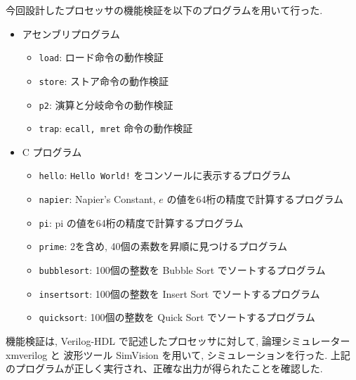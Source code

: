 \documentclass[../main.tex]{subfiles}
\begin{document}
  今回設計したプロセッサの機能検証を以下のプログラムを用いて行った.

  \begin{itemize}
    \item アセンブリプログラム
    \begin{itemize}
      \item \verb|load|: ロード命令の動作検証
      \item \verb|store|: ストア命令の動作検証
      \item \verb|p2|: 演算と分岐命令の動作検証
      \item \verb|trap|: \verb|ecall, mret| 命令の動作検証
    \end{itemize}

    \item C プログラム
    \begin{itemize}
      \item \verb|hello|: \verb|Hello World!| をコンソールに表示するプログラム
      \item \verb|napier|: Napier's Constant, $e$ の値を64桁の精度で計算するプログラム
      \item \verb|pi|: pi の値を64桁の精度で計算するプログラム
      \item \verb|prime|: 2を含め, 40個の素数を昇順に見つけるプログラム
      \item \verb|bubblesort|: 100個の整数を Bubble Sort でソートするプログラム
      \item \verb|insertsort|: 100個の整数を Insert Sort でソートするプログラム
      \item \verb|quicksort|: 100個の整数を Quick Sort でソートするプログラム
    \end{itemize}
  \end{itemize}

  機能検証は, Verilog-HDL で記述したプロセッサに対して, 
  論理シミュレーター xmverilog と
  波形ツール SimVision を用いて, シミュレーションを行った.
  上記のプログラムが正しく実行され、正確な出力が得られたことを確認した.
\end{document}
